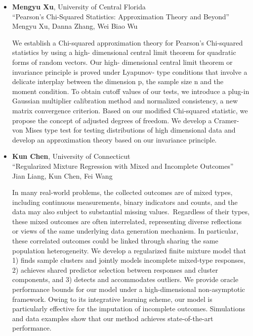 \begin{itemize}
\item \textbf{Mengyu Xu}, University of Central Florida \\
``Pearson's Chi-Squared Statistics: Approximation Theory and Beyond'' \\
Mengyu Xu, Danna Zhang, Wei Biao Wu


We establish a Chi-squared approximation theory for Pearson's Chi-squared statistics by using a high-
dimensional central limit theorem for quadratic forms of random vectors. Our high-
dimensional central limit theorem or invariance principle is proved under Lyapunov-
type conditions that involve a delicate interplay between the dimension p, the sample
size n and the moment condition. To obtain cutoff values of our tests, we introduce a plug-in Gaussian multiplier calibration method and normalized consistency, a new matrix convergence criterion. Based on our modified Chi-squared statistic, we propose the concept of adjusted degrees of freedom. We develop a Cramer-von Mises type test for testing distributions of high dimensional data and develop an approximation theory based on our invariance principle.

\item \textbf{Kun Chen}, University of Connecticut \\
``Regularized Mixture Regression with Mixed and Incomplete Outcomes'' \\
Jian Liang, Kun Chen, Fei Wang


In many real-world problems, the collected outcomes are of mixed types, including continuous measurements, binary indicators and counts, and the data may also subject to substantial missing values. Regardless of their types, these mixed outcomes are often interrelated, representing diverse reflections or views of the same underlying data generation mechanism. In particular, these correlated outcomes could be linked through sharing the same population heterogeneity. We develop a regularized finite mixture model that 1) finds sample clusters and jointly models incomplete mixed-type responses, 2) achieves shared predictor selection between responses and cluster components, and 3) detects and accommodates outliers. We provide oracle performance bounds for our model under a high-dimensional non-asymptotic framework. Owing to its integrative learning scheme, our model is particularly effective for the imputation of incomplete outcomes. Simulations and data examples show that our method achieves state-of-the-art performance.


\end{itemize}
